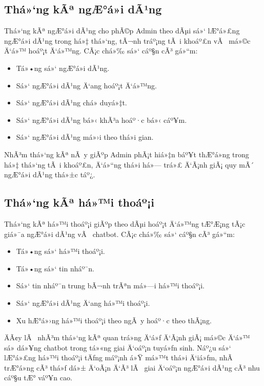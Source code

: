 ﻿\documentclass[12pt,a4paper]{report}
\begin{document}
\subsection{Thá»‘ng kÃª ngÆ°á»i dÃ¹ng}

Thá»‘ng kÃª ngÆ°á»i dÃ¹ng cho phÃ©p Admin theo dÃµi sá»‘ lÆ°á»£ng ngÆ°á»i dÃ¹ng trong há»‡ thá»‘ng, tÃ¬nh tráº¡ng tÃ i khoáº£n vÃ  má»©c Ä‘á»™ hoáº¡t Ä‘á»™ng. CÃ¡c chá»‰ sá»‘ cáº§n cÃ³ gá»“m:

\begin{itemize}
    \item Tá»•ng sá»‘ ngÆ°á»i dÃ¹ng.
    \item Sá»‘ ngÆ°á»i dÃ¹ng Ä‘ang hoáº¡t Ä‘á»™ng.
    \item Sá»‘ ngÆ°á»i dÃ¹ng chá» duyá»‡t.
    \item Sá»‘ ngÆ°á»i dÃ¹ng bá»‹ khÃ³a hoáº·c bá»‹ cáº¥m.
    \item Sá»‘ ngÆ°á»i dÃ¹ng má»›i theo thá»i gian.
\end{itemize}

NhÃ³m thá»‘ng kÃª nÃ y giÃºp Admin phÃ¡t hiá»‡n báº¥t thÆ°á»ng trong há»‡ thá»‘ng tÃ i khoáº£n, Ä‘á»“ng thá»i há»— trá»£ Ä‘Ã¡nh giÃ¡ quy mÃ´ ngÆ°á»i dÃ¹ng thá»±c táº¿.

\subsection{Thá»‘ng kÃª há»™i thoáº¡i}

Thá»‘ng kÃª há»™i thoáº¡i giÃºp theo dÃµi hoáº¡t Ä‘á»™ng tÆ°Æ¡ng tÃ¡c giá»¯a ngÆ°á»i dÃ¹ng vÃ  chatbot. CÃ¡c chá»‰ sá»‘ cáº§n cÃ³ gá»“m:

\begin{itemize}
    \item Tá»•ng sá»‘ há»™i thoáº¡i.
    \item Tá»•ng sá»‘ tin nháº¯n.
    \item Sá»‘ tin nháº¯n trung bÃ¬nh trÃªn má»—i há»™i thoáº¡i.
    \item Sá»‘ ngÆ°á»i dÃ¹ng Ä‘ang há»™i thoáº¡i.
    \item Xu hÆ°á»›ng há»™i thoáº¡i theo ngÃ y hoáº·c theo thÃ¡ng.
\end{itemize}

ÄÃ¢y lÃ  nhÃ³m thá»‘ng kÃª quan trá»ng Ä‘á»ƒ Ä‘Ã¡nh giÃ¡ má»©c Ä‘á»™ sá»­ dá»¥ng chatbot trong tá»«ng giai Ä‘oáº¡n tuyá»ƒn sinh. Náº¿u sá»‘ lÆ°á»£ng há»™i thoáº¡i tÄƒng máº¡nh á»Ÿ má»™t thá»i Ä‘iá»ƒm, nhÃ  trÆ°á»ng cÃ³ thá»ƒ dá»± Ä‘oÃ¡n Ä‘Ã³ lÃ  giai Ä‘oáº¡n ngÆ°á»i dÃ¹ng cÃ³ nhu cáº§u tÆ° váº¥n cao.
\end{document}
